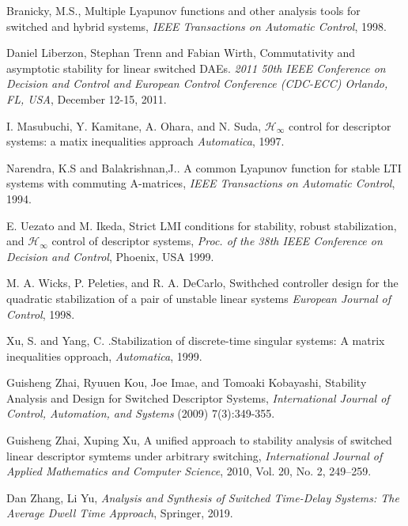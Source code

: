 \begin{thebibliography}{99} %

Branicky, M.S., Multiple Lyapunov functions and other analysis tools for switched and hybrid systems, \emph{IEEE Transactions on Automatic Control}, 1998. 

Daniel Liberzon, Stephan Trenn and Fabian Wirth, Commutativity and asymptotic stability for linear switched DAEs. \emph{2011 50th IEEE Conference on Decision and Control and European Control Conference (CDC-ECC) Orlando, FL, USA}, December 12-15, 2011.

 I. Masubuchi, Y. Kamitane, A. Ohara, and N. Suda, $\mathcal{H}_{\infty}$ control for descriptor systems: a matix inequalities approach  \emph{Automatica}, 1997.

 Narendra, K.S and Balakrishnan,J.. A common Lyapunov function for stable LTI systems with commuting A-matrices, \emph{IEEE Transactions on Automatic Control}, 1994.

 E. Uezato and M. Ikeda, Strict LMI conditions for stability, robust stabilization, and $\mathcal{H}_{\infty}$ control of descriptor systems, \emph{Proc. of the 38th IEEE Conference on Decision and Control}, Phoenix, USA 1999.

 M. A. Wicks, P. Peleties, and R. A. DeCarlo, Swithched controller design for the quadratic stabilization of a pair of unstable linear systems  \emph{European Journal of Control}, 1998.

 Xu, S. and Yang, C. .Stabilization of discrete-time singular systems: A matrix inequalities opproach, \emph{Automatica}, 1999.

Guisheng Zhai, Ryuuen Kou, Joe Imae, and Tomoaki Kobayashi,	Stability Analysis and Design for Switched Descriptor Systems,  \emph{International Journal of Control, Automation, and Systems} (2009) 7(3):349-355.

 Guisheng Zhai, Xuping Xu, A unified approach to stability analysis of switched linear descriptor symtems under arbitrary switching,	\emph{International Journal of Applied Mathematics and Computer Science}, 2010, Vol. 20, No. 2, 249–259.

 Dan Zhang, Li Yu, {\itshape Analysis and Synthesis of Switched Time-Delay Systems: The Average Dwell Time Approach}, Springer, 2019.



\end{thebibliography}
